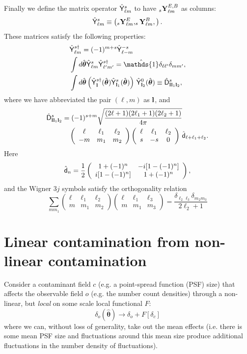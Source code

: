 \documentclass[usenatbib]{mnrasb}
\newcommand{\nv}{\hat{\boldsymbol{\theta}}}
\newcommand{\wtj}[6]{\left(\begin{array}{ccc} #1 & #2 & #3\\#4 & #5 & #6\end{array} \right)}
\newcommand{\mI}{{\mathds{1}}}
\begin{document}
      Finally we define the matrix operator $\hat{\sf Y}^s_{\ell m}$ to have $_s{\bf Y}^{E,B}_{\ell m}$ as columns:
      \begin{equation}
        \hat{\sf Y}^s_{\ell m}\equiv\left(_s{\bf Y}^E_{\ell m},_s{\bf Y}^B_{\ell m},\right).
      \end{equation}
      These matrices satisfy the following properties:
      \begin{align}
        &\hat{\sf Y}^{s\dag}_{\ell m}=(-1)^{m+s}\hat{\sf Y}^{-s}_{\ell -m}\\
        &\int d\nv \hat{\sf Y}^s_{\ell m}\hat{\sf Y}^{s\dag}_{\ell'm'}=\hat\mI\delta_{\ell\ell'}\delta_{mm'},\\
        &\int d\nv \left(\hat{\sf Y}^{s\dag}_{\bf l}(\nv)\hat{\sf Y}^{s}_{{\bf l}_1}(\nv)\right)\,\hat{\sf Y}^0_{{\bf l}_2}(\nv)\equiv\hat{\sf D}^s_{{\bf l}{\bf l}_1{\bf l}_2},
      \end{align}
      where we have abbreviated the pair $(\ell,m)$ as ${\bf l}$, and
      \begin{align}\label{eq:dmat}
        \hat{\sf D}^s_{{\bf l}{\bf l}_1{\bf l}_2}&=(-1)^{s+m}\sqrt{\frac{(2\ell+1)(2\ell_1+1)(2\ell_2+1)}{4\pi}}\\\nonumber
        &\hspace{10pt}\wtj{\ell}{\ell_1}{\ell_2}{-m}{m_1}{m_2}
        \wtj{\ell}{\ell_1}{\ell_2}{s}{-s}{0}\,\hat{\sf d}_{\ell+\ell_1+\ell_2}.
      \end{align}
      Here
      \begin{equation}
        \hat{\sf d}_n= \frac{1}{2}\left(\begin{array}{cc}
                                            1+(-1)^n & -i[1-(-1)^n]\\
                                            i[1-(-1)^n] & 1+(-1)^n
                                          \end{array}\right),
      \end{equation}
      and the Wigner 3$j$ symbols satisfy the orthogonality relation
      \begin{equation}\label{eq:3jorth}
        \sum_{mm_1}\wtj{\ell}{\ell_1}{\ell_2}{m}{m_1}{m_2}\wtj{\ell}{\ell_1}{\ell_3}{m}{m_1}{m_3}=\frac{\delta_{\ell_2\ell_3}\delta_{m_2m_3}}{2\ell_2+1}
      \end{equation}

  \section{Linear contamination from non-linear contamination} \label{app:lincont}
    Consider a contaminant field $c$ (e.g. a point-spread function (PSF) size) that affects the observable field $o$ (e.g. the number count densities) through a non-linear, but \emph{local} on some scale local functional $F$:
    \begin{equation}
      \delta_o(\nv) \rightarrow \delta_o + F [ \delta_c ]
    \end{equation}
    where we can, without loss of generality, take out the mean effects (i.e. there is some mean PSF size and fluctuations around this mean size produce additional fluctuations in the number density of fluctuations).
\end{document}

